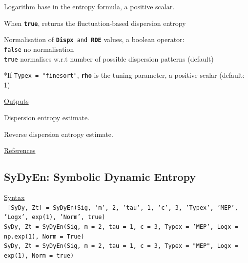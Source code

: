 \documentclass[12pt, a4paper, titlepage, openany]{book}
\begin{document}
\begin{description}[labelsep=1cm, labelwidth=2cm, nosep, style=multiline,leftmargin=3cm]
\begin{description}[labelsep=5em, labelwidth=8em, nosep,style=multiline,leftmargin=3cm]
	\end{description}
\item[\texttt{Logx}]	Logarithm base in the entropy formula, a positive scalar.
\item[\texttt{Fluct}]	When \texttt{\textbf{true}}, returns the fluctuation-based dispersion entropy \cite{Disp2}
\item[\texttt{Norm}]    Normalisation of \texttt{\textbf{Dispx} and \textbf{RDE}} values, a boolean operator:\\
		  \texttt{false} \hspace{10pt} no normalisation \\
		  \texttt{true} \hspace{15pt}  normalises w.r.t number of possible dispersion patterns (default)
\item[\texttt{rho}]		*If \texttt{Typex = "finesort"}, \texttt{\textbf{rho}} is the tuning parameter, a positive scalar (default: 1)
\end{description}

\noindent \ul{Outputs}
\begin{description}[labelsep=1cm, labelwidth=2cm, nosep, style=multiline,leftmargin=3cm]\footnotesize
\item[\texttt{Dispx}]		Dispersion entropy estimate.
\item[\texttt{RDE}]		Reverse dispersion entropy estimate.  \cite{Disp3}
\end{description}

\noindent \ul{References}\hspace{1cm}
\cite{Disp1} \cite{Disp2} \cite{Disp3} \cite{Disp4}



\newpage
\subsection{\normalsize SyDyEn: \hspace{15mm} Symbolic Dynamic Entropy}
\noindent\ul{Syntax} \vspace{6mm} \\ \noindent \texttt{\footnotesize
[SyDy, Zt] = SyDyEn(Sig, 'm', 2, 'tau', 1, 'c', 3, 'Typex', 'MEP', 'Logx', exp(1), 'Norm', true)\\
SyDy, Zt = SyDyEn(Sig, m = 2, tau = 1, c = 3, Typex = 'MEP', Logx = np.exp(1), Norm = True)\\
SyDy, Zt = SyDyEn(Sig, m = 2, tau = 1, c = 3, Typex = "MEP", Logx = exp(1), Norm = true)}
\end{document}
